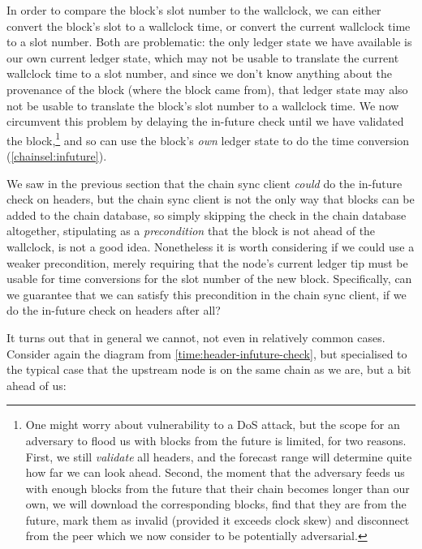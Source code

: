 In order to compare the block's slot number to the wallclock, we can either
convert the block's slot to a wallclock time, or convert the current wallclock
time to a slot number. Both are problematic: the only ledger state we have
available is our own current ledger state, which may not be usable to translate
the current wallclock time to a slot number, and since we don't know anything
about the provenance of the block (where the block came from), that ledger state
may also not be usable to translate the block's slot number to a wallclock time.
We now circumvent this problem by delaying the in-future check until we have
validated the block,\footnote{One might worry about vulnerability to a DoS
attack, but the scope for an adversary to flood us with blocks from the future
is limited, for two reasons. First, we still \emph{validate} all headers, and
the forecast range will determine quite how far we can look ahead. Second, the
moment that the adversary feeds us with enough blocks from the future that their
chain becomes longer than our own, we will download the corresponding
blocks, find that they are from the future, mark them as invalid (provided it
exceeds clock skew) and disconnect from the peer which we now consider to be
potentially adversarial.} and so can use the block's \emph{own} ledger state to
do the time conversion (\cref{chainsel:infuture}).

We saw in the previous section that the chain sync client \emph{could} do the
in-future check on headers, but the chain sync client is not the only way that
blocks can be added to the chain database, so simply skipping the check in the
chain database altogether, stipulating as a \emph{precondition} that the block
is not ahead of the wallclock, is not a good idea. Nonetheless it is worth
considering if we could use a weaker precondition, merely requiring that the
node's current ledger tip must be usable for time conversions for the slot
number of the new block. Specifically, can we guarantee that we can satisfy this
precondition in the chain sync client, if we do the in-future check on headers
after all?

It turns out that in general we cannot, not even in relatively common cases.
Consider again the diagram from \cref{time:header-infuture-check}, but
specialised to the typical case that the upstream node is on the same chain as
we are, but a bit ahead of us:

\begin{center}
\end{center}

